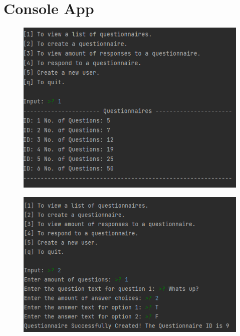 \documentclass[12pt, oneside, a4paper]{article}
\begin{document}
    \section{Console App}
    \FloatBarrier
    \begin{figure}[H] 
        \centerline{
        \includegraphics[width=\textwidth]{console_list_of_questionnaires.PNG}
        }
    \end{figure}
    \FloatBarrier
    \begin{figure}[H] 
        \centerline{
        \includegraphics[width=\textwidth]{console_create_questionnaire.PNG}
        }
    \end{figure}
    \FloatBarrier
\end{document}
